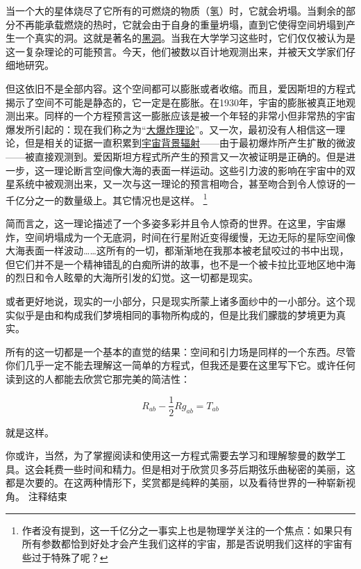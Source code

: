     当一个大的星体烧尽了它所有的可燃烧的物质（氢）时，它就会坍塌。当剩余的部分不再能承载燃烧的热时，它就会由于自身的重量坍塌，直到它使得空间坍塌到产生一个真实的洞。这就是著名的\href{http://toyhouse.cc/wiki/index.php/黑洞}{黑洞}。当我在大学学习这些时，它们仅仅被认为是这一复杂理论的可能预言。今天，他们被数以百计地观测出来，并被天文学家们仔细地研究。

    但这依旧不是全部内容。这个空间都可以膨胀或者收缩。而且，爱因斯坦的方程式揭示了空间不可能是静态的，它一定是在膨胀。在1930年，宇宙的膨胀被真正地观测出来。同样的一个方程预言这一膨胀应该是被一个年轻的非常小但非常热的宇宙爆发所引起的：现在我们称之为“\href{https://en.wikipedia.org/wiki/Big Bang}{大爆炸理论}”。又一次，最初没有人相信这一理论，但是相关的证据一直积累到\href{http://toyhouse.cc/wiki/index.php/宇宙背景辐射}{宇宙背景辐射}——由于最初爆炸所产生扩散的微波——被直接观测到。爱因斯坦方程式所产生的预言又一次被证明是正确的。但是进一步，这一理论断言空间像大海的表面一样运动。这些引力波的影响在宇宙中的双星系统中被观测出来，又一次与这一理论的预言相吻合，甚至吻合到令人惊讶的一千亿分之一的数量级上。其它情况也是这样。
\footnote[5]
{
作者没有提到，这一千亿分之一事实上也是物理学关注的一个焦点：如果只有所有参数都恰到好处才会产生我们这样的宇宙，那是否说明我们这样的宇宙有些过于特殊了呢？
}

    简而言之，这一理论描述了一个多姿多彩并且令人惊奇的世界。在这里，宇宙爆炸，空间坍塌成为一个无底洞，时间在行星附近变得缓慢，无边无际的星际空间像大海表面一样波动……这所有的一切，都渐渐地在我那本被老鼠咬过的书中出现，但它们并不是一个精神错乱的白痴所讲的故事，也不是一个被卡拉比亚地区地中海的烈日和令人眩晕的大海所引发的幻觉。这一切都是现实。

    或者更好地说，现实的一小部分，只是现实所蒙上诸多面纱中的一小部分。这个现实似乎是由和构成我们梦境相同的事物所构成的，但是比我们朦胧的梦境更为真实。

    所有的这一切都是一个基本的直觉的结果：空间和引力场是同样的一个东西。尽管你们几乎一定不能去理解这一简单的方程式，但我还是要在这里写下它。或许任何读到这的人都能去欣赏它那完美的简洁性：
    
$$R_{ab}-\frac{1}{2}Rg_{ab}=T_{ab}$$                      

    就是这样。

    你或许，当然，为了掌握阅读和使用这一方程式需要去学习和理解黎曼的数学工具。这会耗费一些时间和精力。但是相对于欣赏贝多芬后期弦乐曲秘密的美丽，这都是次要的。在这两种情形下，奖赏都是纯粹的美丽，以及看待世界的一种崭新视角。
{{注释结束}}


